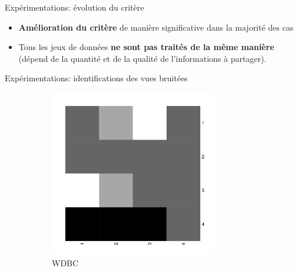 \documentclass[hyperref={pdfpagelabels=false}]{beamer}
\begin{document}
\begin{frame}{Expérimentations: évolution du critère}
        \begin{itemize}
            \item \textbf{Amélioration du critère} de manière significative dans 
                la majorité des cas
            \item Tous les jeux de données \textbf{ne sont pas traités de la 
                même manière} (dépend de la quantité et de la qualité de 
                l'informations à partager).
        \end{itemize}
    \end{frame}

    \begin{frame}{Expérimentations: identifications des vues bruitées}
        \begin{figure}[b]
            \centering
            \caption{Cartes de chaleur des matrices de $\beta$ pour chaque jeu 
                de données.\\$M(i,j)$ correspond à l'importance accordée à la 
                Vue j par la Vue i.\\Blanc = forte collaboration - noir = faible 
                collaboration -  diagonale représente $\beta=1$.
            }
            \begin{subfigure}[b]{0.32\textwidth}
                \centering
                \includegraphics[width=0.8\textwidth]{wdbc_bw}
                \caption{WDBC}
            \end{subfigure}
            \begin{subfigure}[b]{0.32\textwidth}
                \centering

\end{subfigure}
\end{figure}
\end{frame}
\end{document}
